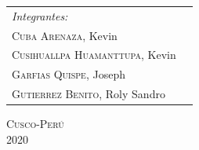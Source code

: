 \begin{titlepage}
\begin{center}
     \begin{tabular}{ll}
       \emph{Integrantes:}\\ [0.3cm]
       \hspace{3cm}   \textsc{Cuba Arenaza,} Kevin  \\
       \hspace{3cm}   \textsc{Cusihuallpa Huamanttupa,} Kevin  \\
       \hspace{3cm}   \textsc{Garfias Quispe,} Joseph  \\
       \hspace{3cm}   \textsc{Gutierrez Benito,} Roly Sandro  \\

     \end{tabular}
     
     \vspace{4mm}
   \begin{center}
    \textsc{Cusco-Perú}\\
    \textsc{2020}
    \end{center}
     
   \end{center}
\end{titlepage}
